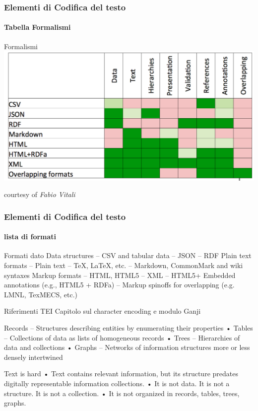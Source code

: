 \begin{frame}
    \frametitle{Elementi di Codifica del testo}
    \framesubtitle{Tabella Formalismi}
    \addtocounter{nframe}{1}
    
    \begin{block}{Formalismi}
	    \includegraphics[width=.5\textwidth]{imgs/TabellaFormalismiCodificaTesto.png}
    \end{block}
    courtesy of \textit{Fabio Vitali}

\end{frame}


\begin{frame}
    \frametitle{Elementi di Codifica del testo}
    \framesubtitle{lista di formati}
    \addtocounter{nframe}{1}
    
    \begin{block}{Formati dato}
Data structures – CSV and tabular data
– JSON
– RDF
Plain text formats – Plain text
– TeX, LaTeX, etc.
– Markdown, CommonMark and wiki syntaxes
Markup formats
– HTML, HTML5
– XML
– HTML5+ Embedded annotations (e.g., HTML5 + RDFa)
– Markup spinoffs for overlapping (e.g. LMNL, TexMECS, etc.) 

    \end{block}

    \begin{block}{Riferimenti TEI}
        Capitolo sul character encoding e modulo Ganji 
    \end{block}

\end{frame}


Records
– Structures describing entities by enumerating their
properties
• Tables
– Collections of data as lists of homogeneous
records
• Trees
– Hierarchies of data and collections
• Graphs
– Networks of information structures more or less
densely intertwined 




Text is hard
• Text contains relevant information, but its
structure predates digitally representable
information collections.
• It is not data. It is not a structure. It is not a
collection.
• It is not organized in records, tables, trees,
graphs. 


